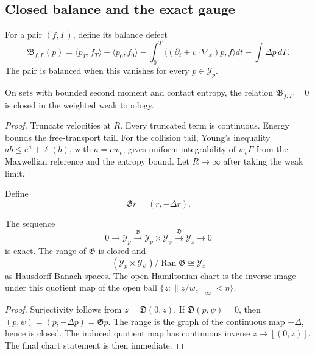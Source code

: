 \subsection{Closed balance and the exact gauge}

For a pair \((f,\Gamma)\), define its balance defect
\[
 \mathfrak B_{f,\Gamma}(p)=
 \langle p_T,f_T\rangle-\langle p_0,f_0\rangle
 -\int_0^T\langle(\partial_t+v\cdot\nabla_x)p,f\rangle dt
 -\int\Delta p\,d\Gamma.
\]
The pair is balanced when this vanishes for every \(p\in\mathcal Y_p\).

\begin{lemma}
\label{lem:r5-b3-balance}
On sets with bounded second moment and contact entropy, the relation
\(\mathfrak B_{f,\Gamma}=0\) is closed in the weighted weak topology.
\end{lemma}

\begin{proof}
Truncate velocities at \(R\).  Every truncated term is continuous.  Energy
bounds the free-transport tail.  For the collision tail, Young's inequality
\(ab\le e^a+\ell(b)\), with
\(a=cw_c\), gives uniform integrability of \(w_c\Gamma\) from the Maxwellian
reference and the entropy bound.  Let \(R\to\infty\) after taking the weak
limit.
\end{proof}

Define
\[
 \mathfrak G r=(r,-\Delta r).
\]

\begin{theorem}
\label{thm:r5-b3-gauge}
The sequence
\[
 0\longrightarrow\mathcal Y_p
 \xrightarrow{\mathfrak G}
 \mathcal Y_p\times\mathcal Y_\psi
 \xrightarrow{\mathfrak D}
 \mathcal Y_z\longrightarrow0
\]
is exact.  The range of \(\mathfrak G\) is closed and
\[
 (\mathcal Y_p\times\mathcal Y_\psi)/\operatorname{Ran}\mathfrak G
 \cong\mathcal Y_z
\]
as Hausdorff Banach spaces.  The open Hamiltonian chart is the inverse image
under this quotient map of the open ball
\(\{z:\|z/w_c\|_\infty<\eta\}\).
\end{theorem}

\begin{proof}
Surjectivity follows from \(z=\mathfrak D(0,z)\).  If
\(\mathfrak D(p,\psi)=0\), then
\((p,\psi)=(p,-\Delta p)=\mathfrak Gp\).  The range is the graph of the
continuous map \(-\Delta\), hence is closed.  The induced quotient map has
continuous inverse \(z\mapsto[(0,z)]\).  The final chart statement is then
immediate.
\end{proof}

